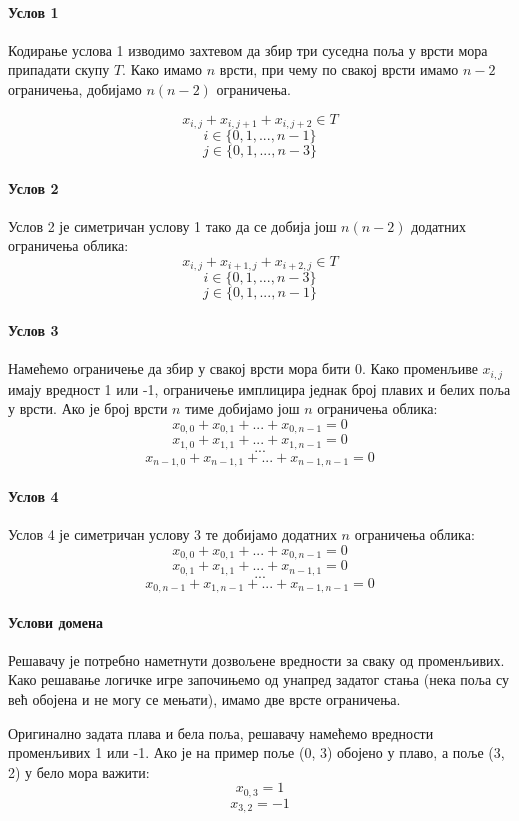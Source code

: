 \documentclass[a4paper]{article}
\begin{document}
\paragraph{Услов 1}
Кодирање услова 1 изводимо захтевом да збир три суседна поља у врсти мора припадати скупу $T$. Како имамо $n$ врсти,
при чему по свакој врсти имамо $n-2$ ограничења, добијамо $n(n-2)$ ограничења.

$$ x_{i,j} + x_{i, j+1} + x_{i, j+2} \in T $$
$$ i \in \{0, 1, ..., n-1\} $$
$$ j \in \{0, 1, ..., n-3\} $$

\paragraph{Услов 2}
Услов 2 је симетричан услову 1 тако да се добија још $n(n-2)$ додатних ограничења облика:
$$ x_{i, j} + x_{i+1, j} + x_{i+2, j} \in T $$
$$ i \in \{0, 1, ..., n-3\} $$
$$ j \in \{0, 1, ..., n-1\} $$

\paragraph{Услов 3}
Намећемо ограничење да збир у свакој врсти мора бити 0. Како променљиве $x_{i, j}$ имају вредност 1 или -1, ограничење
имплицира једнак број плавих и белих поља у врсти. Ако је број врсти $n$ тиме добијамо још $n$ ограничења облика:
$$ x_{0, 0} + x_{0, 1} + ... + x_{0, n-1} = 0 $$
$$ x_{1, 0} + x_{1, 1} + ... + x_{1, n-1} = 0 $$
$$ ...  $$
$$ x_{n-1, 0} + x_{n-1, 1} + ... + x_{n-1, n-1} = 0 $$

\paragraph{Услов 4}
Услов 4 је симетричан услову 3 те добијамо додатних $n$ ограничења облика:
$$ x_{0, 0} + x_{0, 1} + ... + x_{0, n-1} = 0 $$
$$ x_{0, 1} + x_{1, 1} + ... + x_{n-1, 1} = 0 $$
$$ ...  $$
$$ x_{0, n-1} + x_{1, n-1} + ... + x_{n-1, n-1} = 0 $$

\paragraph{Услови домена}
Решавачу је потребно наметнути дозвољене вредности за сваку од променљивих. Како решавање логичке игре започињемо
од унапред задатог стања (нека поља су већ обојена и не могу се мењати), имамо две врсте ограничења.

Оригинално задата плава и бела поља, решавачу намећемо вредности променљивих 1 или -1. Ако је на пример
поље (0, 3) обојено у плаво, а поље (3, 2) у бело мора важити:
$$ x_{0, 3} = 1 $$
$$ x_{3, 2} = -1 $$
\end{document}
